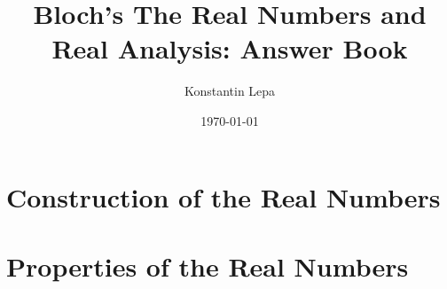 \documentclass[reqno]{amsbook}
\title{Bloch's The Real Numbers and Real Analysis: Answer Book}
\author{Konstantin Lepa}
\date{\today}
\begin{document}
\begin{preview}

    \maketitle

    \Newpage
    \chapter{Construction of the Real Numbers}

    \Newpage
    

    \Newpage
    

    \Newpage
    

    \Newpage
    

    \Newpage
    

    \Newpage
    

    \Newpage
    


    \Newpage
    \chapter{Properties of the Real Numbers}

    \addtocounter{section}{4}

    \Newpage
    


    \Newpage
    \begin{thebibliography}{99}
    \end{thebibliography}

\end{preview}
\end{document}

